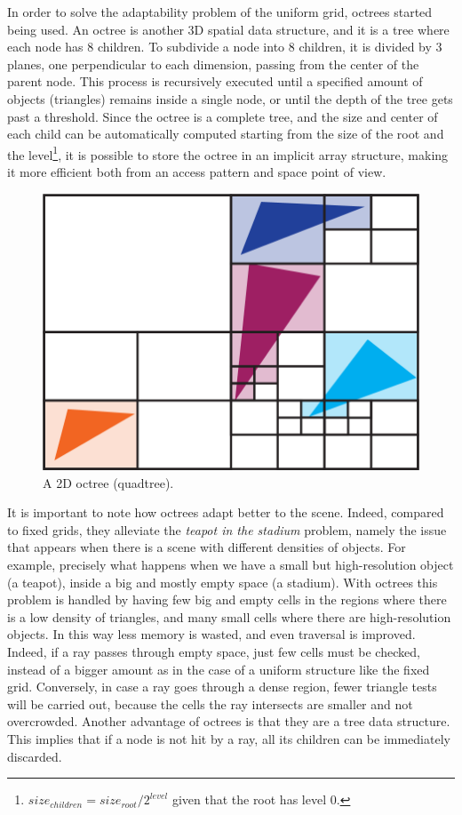\documentclass{PoliMi_MasterThesis}
\begin{document}
In order to solve the adaptability problem of the uniform grid, octrees started being used. An octree is another 3D spatial data structure, and it is a tree where each node has 8 children. To subdivide a node into 8 children, it is divided by 3 planes, one perpendicular to each dimension, passing from the center of the parent node. This process is recursively executed until a specified amount of objects (triangles) remains inside a single node, or until the depth of the tree gets past a threshold. Since the octree is a complete tree, and the size and center of each child can be automatically computed starting from the size of the root and the level\footnote{$size_{children} = size_{root} / 2^{level}$ given that the root has level $0$.}, it is possible to store the octree in an implicit array structure, making it more efficient both from an access pattern and space point of view.

\begin{figure}[H]
    \centering
    \includegraphics[width=\textwidth*\real{0.45}]{Images/quadtree.png}
    \caption{A 2D octree (quadtree).}
    \label{fig:octree}
\end{figure}

It is important to note how octrees adapt better to the scene. Indeed, compared to fixed grids, they alleviate the \textit{teapot in the stadium} problem, namely the issue that appears when there is a scene with different densities of objects. For example, precisely what happens when we have a small but high-resolution object (a teapot), inside a big and mostly empty space (a stadium). With octrees this problem is handled by having few big and empty cells in the regions where there is a low density of triangles, and many small cells where there are high-resolution objects. In this way less memory is wasted, and even traversal is improved. Indeed, if a ray passes through empty space, just few cells must be checked, instead of a bigger amount as in the case of a uniform structure like the fixed grid. Conversely, in case a ray goes through a dense region, fewer triangle tests will be carried out, because the cells the ray intersects are smaller and not overcrowded. Another advantage of octrees is that they are a tree data structure. This implies that if a node is not hit by a ray, all its children can be immediately discarded.
\end{document}
